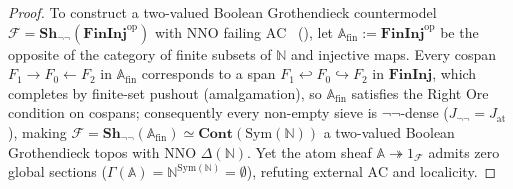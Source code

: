 \begin{proof}
To construct a two-valued Boolean Grothendieck countermodel $\mathcal{F} = \mathbf{Sh}_{\neg\neg}(\mathbf{FinInj}^{\mathrm{op}})$ with $\mathrm{NNO}$ failing $\mathrm{AC}$~\cite{Freyd72} (\cite[\S D4.5]{Johnstone02}), let $\mathbb{A}_{\mathrm{fin}} := \mathbf{FinInj}^{\mathrm{op}}$ be the opposite of the category of finite subsets of $\mathbb{N}$ and injective maps. Every cospan $F_1 \to F_0 \leftarrow F_2$ in $\mathbb{A}_{\mathrm{fin}}$ corresponds to a span $F_1 \hookleftarrow F_0 \hookrightarrow F_2$ in $\mathbf{FinInj}$, which completes by finite-set pushout (amalgamation), so $\mathbb{A}_{\mathrm{fin}}$ satisfies the Right Ore condition on cospans; consequently every non-empty sieve is $\neg\neg$-dense ($J_{\neg\neg} = J_{\mathrm{at}}$), making $\mathcal{F} = \mathbf{Sh}_{\neg\neg}(\mathbb{A}_{\mathrm{fin}}) \simeq \mathbf{Cont}(\mathrm{Sym}(\mathbb{N}))$ a two-valued Boolean Grothendieck topos with $\mathrm{NNO}$ $\Delta(\mathbb{N})$. Yet the atom sheaf $\mathbb{A} \twoheadrightarrow 1_{\mathcal{F}}$ admits zero global sections ($\Gamma(\mathbb{A}) = \mathbb{N}^{\mathrm{Sym}(\mathbb{N})} = \emptyset$), refuting external $\mathrm{AC}$ and localicity.


\end{proof}
